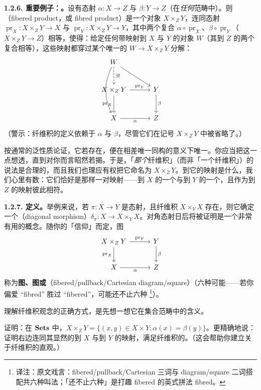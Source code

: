 \textbf{1.2.6. 重要例子：\trFiberProduct。}\quad 设有态射 $\alpha\colon X\to Z$ 与 $\beta\colon Y\to Z$（在\emph{任何}范畴中）。则\textbf{\trFiberProduct}（fibered product，或 fibred product）是一个对象 $X\times_Z Y$，连同态射 $\operatorname{pr}_X\colon X\times_Z Y\to X$ 与 $\operatorname{pr}_Y\colon X\times_Z Y\to Y$，其中两个复合 $\alpha\circ\operatorname{pr}_X$、$\beta\circ\operatorname{pr}_Y$（$X\times_Z Y\to Z$）相等，使得：给定任何带映射到 $X$ 与 $Y$ 的对象 $W$（其到 $Z$ 的两个复合相等），这些映射都穿过某个唯一的 $W\to X\times_Z Y$ 分解：
\[
\begin{tikzcd}[row sep=2.5em, column sep=3em]
W \ar[d,dashed,"\exists!"] \ar[dd,bend right=25] \ar[dr] & \\
X\times_Z Y \ar[r,"{\operatorname{pr}_Y}"] \ar[d,"{\operatorname{pr}_X}"'] & Y \ar[d,"\beta"] \\
X \ar[r,"\alpha"'] & Z
\end{tikzcd}
\]
（警示：纤维积的定义依赖于 $\alpha$ 与 $\beta$，尽管它们在记号 $X\times_Z Y$ 中被省略了。）

按通常的泛性质论证，它若存在，便在相差唯一同构的意义下唯一。你应当把这一点想透，直到对你而言昭然若揭。于是，「\emph{那个}纤维积」（而非「一个纤维积」）的说法是合理的，而且我们也理应有权把它命名为 $X\times_Z Y$。到它的映射是什么，我们心里有数：它们恰好是那样一对映射——到 $X$ 的一个与到 $Y$ 的一个，且作为到 $Z$ 的映射彼此相符。

\textbf{1.2.7. 定义。}\quad 举例来说，若 $\pi\colon X\to Y$ 是态射，且纤维积 $X\times_Y X$ 存在，则它确定一个\textbf{\trDiagonalMorphism}（diagonal morphism）$\delta_\pi\colon X\to X\times_Y X$。对角态射日后将被证明是一个非常有用的概念。随你的「信仰」而定，图
\[
\begin{tikzcd}[row sep=2.1em, column sep=3em]
X\times_Z Y \ar[r,"{\operatorname{pr}_Y}"] \ar[d,"{\operatorname{pr}_X}"'] & Y \ar[d,"\beta"] \\
X \ar[r,"\alpha"'] & Z
\end{tikzcd}
\]
称为\textbf{\trFiberProduct{}图、\trPullback{}图或\trCartesianDiagram}（fibered/pullback/Cartesian diagram/square）（六种可能——若你偏爱 “fibred” 胜过 “fibered”，可能还不止六种%
\footnote{译注：原文戏言：fibered/pullback/Cartesian 三词与 diagram/square 二词搭配共六种叫法；「还不止六种」是打趣 fibered 的英式拼法 fibred。}）。

理解纤维积观念的正确方式，是先想一想它在集合范畴中的含义。

\begin{exercise}\label{ex:fiber-product-in-sets}
证明：在 $\mathbf{Sets}$ 中，$X\times_Z Y=\{(x,y)\in X\times Y:\alpha(x)=\beta(y)\}$。更精确地说：证明右边连同其显然的到 $X$ 与到 $Y$ 的映射，满足纤维积的\trUniversalProperty{}。（这会帮助你建立关于纤维积的直观。）
\end{exercise}

